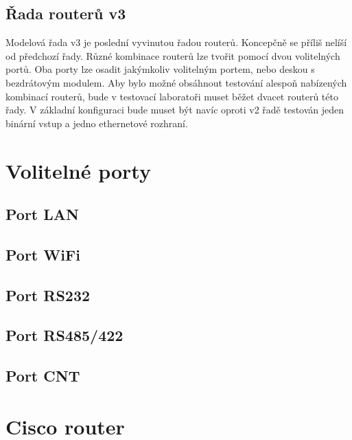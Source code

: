 \subsection{Řada routerů v3}
Modelová řada v3 je poslední vyvinutou řadou routerů. Koncepčně se příliš nelíší od předchozí řady. Různé kombinace routerů lze tvořit pomocí dvou volitelných portů. Oba porty lze osadit jakýmkoliv volitelným portem, nebo deskou s bezdrátovým modulem. Aby bylo možné obsáhnout testování alespoň nabízených kombinací routerů, bude v testovací laboratoři muset běžet dvacet routerů této řady. V základní konfiguraci bude muset být navíc oproti v2 řadě testován jeden binární vstup a jedno ethernetové rozhraní.


\section{Volitelné porty}
\subsection{Port LAN}
\subsection{Port WiFi}
\subsection{Port RS232}
\subsection{Port RS485/422}
\subsection{Port CNT}

\section{Cisco router}




\endinput
